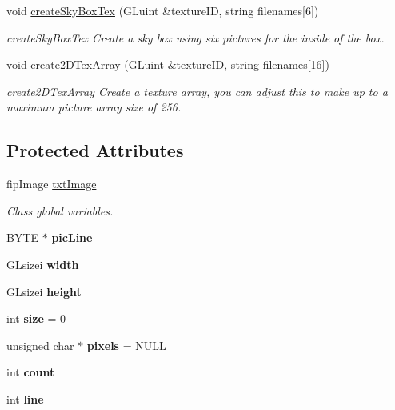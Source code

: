 \begin{DoxyCompactItemize}
void \hyperlink{classCreateImage_acbff5ee9dfb7e64bcf850cce6f3ee13d}{create\+Sky\+Box\+Tex} (G\+Luint \&texture\+ID, string filenames\mbox{[}6\mbox{]})
\begin{DoxyCompactList}\small\item\em create\+Sky\+Box\+Tex Create a sky box using six pictures for the inside of the box. \end{DoxyCompactList}\item 
void \hyperlink{classCreateImage_a51bb6307d7b106aab55292813ef8b694}{create2\+D\+Tex\+Array} (G\+Luint \&texture\+ID, string filenames\mbox{[}16\mbox{]})
\begin{DoxyCompactList}\small\item\em create2\+D\+Tex\+Array Create a texture array, you can adjust this to make up to a maximum picture array size of 256. \end{DoxyCompactList}\end{DoxyCompactItemize}
\subsection*{Protected Attributes}
\begin{DoxyCompactItemize}
\item 
\mbox{\label{classCreateImage_aef75789ae909e699137dd13bfb6c8ae3}} 
fip\+Image \hyperlink{classCreateImage_aef75789ae909e699137dd13bfb6c8ae3}{txt\+Image}
\begin{DoxyCompactList}\small\item\em Class global variables. \end{DoxyCompactList}\item 
\mbox{\label{classCreateImage_a75be3bf73393293b28bf3a4f67c2acfb}} 
B\+Y\+TE $\ast$ {\bfseries pic\+Line}
\item 
\mbox{\label{classCreateImage_a820c4459b175116be89caf19a46926ae}} 
G\+Lsizei {\bfseries width}
\item 
\mbox{\label{classCreateImage_a2932fbd279fc1407a74fbfa37d2857df}} 
G\+Lsizei {\bfseries height}
\item 
\mbox{\label{classCreateImage_a409d26c7a384b82b0638c25a2b6b2194}} 
int {\bfseries size} = 0
\item 
\mbox{\label{classCreateImage_a8ac66363719dbbba5386527ec970c2fe}} 
unsigned char $\ast$ {\bfseries pixels} = N\+U\+LL
\item 
\mbox{\label{classCreateImage_a52d1bf19d5ca8be287e93b811fc29d2f}} 
int {\bfseries count}
\item 
\mbox{\label{classCreateImage_aaeeb240ef49097e5968c02996dcd7b01}} 
int {\bfseries line}
\end{DoxyCompactItemize}


